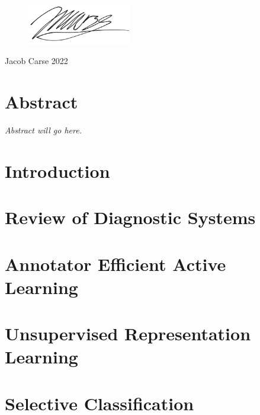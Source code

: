 \documentclass[12pt]{report}
\begin{document}
	\vspace{30pt}
	\begin{flushright}
		\begin{figure}[h]
			\begin{flushright}
				\includegraphics[width=0.4\textwidth]{images/signature.png}
			\end{flushright}
		\end{figure}
	
		Jacob Carse
		2022
	
	\end{flushright}

	\chapter*{Abstract}
	\textit{Abstract will go here.}

	
	\newpage
	\chapter{Introduction}
	\label{ch:introduction}
	
	
	\chapter{Review of Diagnostic Systems}
	\label{ch:review_of_diagnostic_systems}
	
	
	\chapter{Annotator Efficient Active Learning}
	\label{ch:active_learning}
	
	
	\chapter{Unsupervised Representation Learning}
	\label{ch:unsupervised_representation_learning}
	
	
	\chapter{Selective Classification}
	\label{ch:selective_classification}
	
	
\end{document}

